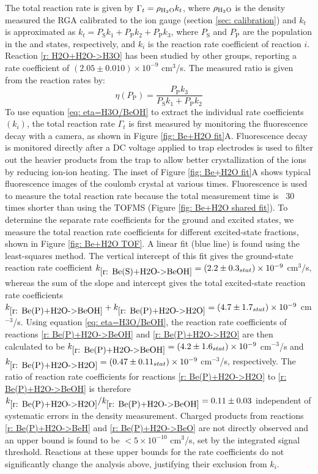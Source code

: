 The total reaction rate is given by $\Gamma_t = \rho_{\ce{H2O}} k_t$, where $\rho_{\ce{H2O}}$ is the  density measured the RGA calibrated to the ion gauge (section \ref{sec: calibration}) and $k_t$ is approximated as $k_t = P_\text{S} k_1 + P_\text{P} k_2 + P_\text{P} k_3$, where $P_\text{S}$ and $P_\text{P}$ are the  population in the  and  states, respectively, and $k_i$ is the reaction rate coefficient of reaction $i$. Reaction \cref{r: H2O+H2O->H3O} has been studied by other groups, reporting a rate coefficient of $(2.05 \pm 0.010) \times 10^{-9}$ cm$^3$/s.\cite{Huntress2004} The measured  ratio is given from the reaction rates by:
\begin{equation}
	\eta(P_\text{P}) = \frac{P_\text{P} k_3}{P_\text{S} k_1 + P_\text{P} k_2}
	\label{eq: eta=H3O/BeOH}
\end{equation}
To use equation \ref{eq: eta=H3O/BeOH} to extract the individual rate coefficients $(k_i)$, the total reaction rate $\Gamma_t$ is first measured by monitoring the  fluorescence decay with a camera, as shown in Figure \ref{fig: Be+H2O fit}A. Fluorescence decay is monitored directly after a DC voltage applied to trap electrodes is used to filter out the heavier products from the trap to allow better crystallization of the  ions by reducing ion-ion heating.\cite{Chen2013} The inset of Figure \ref{fig: Be+H2O fit}A shows typical fluorescence images of the  coulomb crystal at various times. Fluorescence is used to measure the total reaction rate because the total measurement time is ~30 times shorter than using the TOFMS (Figure \ref{fig: Be+H2O shared fit}). To determine the separate rate coefficients for the  ground and excited states, we measure the total reaction rate coefficients for different excited-state fractions, shown in Figure \ref{fig: Be+H2O TOF}. A linear fit (blue line) is found using the least-squares method. The vertical intercept of this fit gives the  ground-state reaction rate coefficient $k_{\ref{r: Be(S)+H2O->BeOH}}=(2.2 \pm 0.3_{stat}) \times 10^{-9}$ cm$^3/$s, whereas the sum of the slope and intercept gives the total excited-state  reaction rate coefficients $k_{\ref{r: Be(P)+H2O->BeOH}} + k_{\ref{r: Be(P)+H2O->H2O}} = (4.7 \pm 1.7_{stat}) \times 10^{-9}$ cm$^{-3}$/s. Using equation \ref{eq: eta=H3O/BeOH}, the reaction rate coefficients of reactions \ref{r: Be(P)+H2O->BeOH} and \ref{r: Be(P)+H2O->H2O} are then calculated to be $k_{\ref{r: Be(P)+H2O->BeOH}} = (4.2 \pm 1.6_{stat}) \times 10^{-9}$ cm$^{-3}$/s and $k_{\ref{r: Be(P)+H2O->H2O}} = (0.47 \pm 0.11_{stat}) \times 10^{-9}$ cm$^{-3}$/s, respectively. The ratio of reaction rate coefficients for reactions \ref{r: Be(P)+H2O->H2O} to \ref{r: Be(P)+H2O->BeOH} is therefore $k_{\ref{r: Be(P)+H2O->H2O}}/k_{\ref{r: Be(P)+H2O->BeOH}} = 0.11 \pm 0.03$ independent of systematic errors in the density measurement. Charged products from reactions \ref{r: Be(P)+H2O->BeH} and \ref{r: Be(P)+H2O->BeO} are not directly observed and an upper bound is found to be $<5\times10^{-10}$ cm$^3$/s, set by the integrated signal threshold. Reactions at these upper bounds for the rate coefficients do not significantly change the analysis above, justifying their exclusion from $k_i$.

